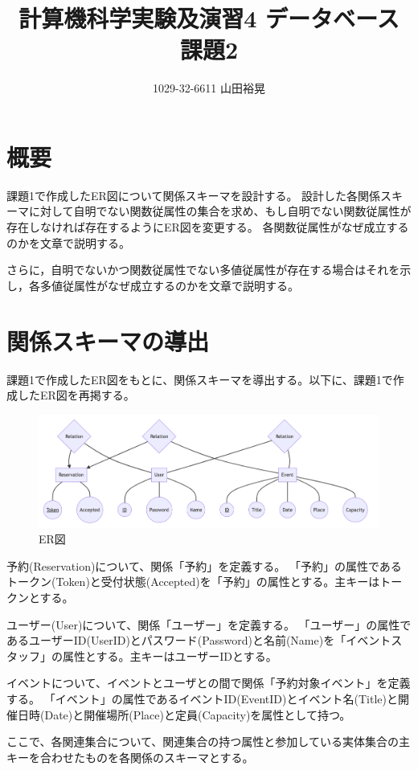 \documentclass[dvipdfmx]{jarticle}
\begin{document}
\title{計算機科学実験及演習4 データベース 課題2}
\author{1029-32-6611 山田裕晃}
\maketitle

\section{概要}
課題1で作成したER図について関係スキーマを設計する。
設計した各関係スキーマに対して自明でない関数従属性の集合を求め、もし自明でない関数従属性が存在しなければ存在するようにER図を変更する。
各関数従属性がなぜ成立するのかを文章で説明する。

さらに，自明でないかつ関数従属性でない多値従属性が存在する場合はそれを示し，各多値従属性がなぜ成立するのかを文章で説明する。

\section{関係スキーマの導出}
課題1で作成したER図をもとに、関係スキーマを導出する。以下に、課題1で作成したER図を再掲する。
\begin{figure}[H]
  \centering
  \includegraphics[scale=0.4]{ermodel.png}
  \caption{ER図}
\end{figure}

予約(Reservation)について、関係「予約」を定義する。
「予約」の属性であるトークン(Token)と受付状態(Accepted)を「予約」の属性とする。主キーはトークンとする。

ユーザー(User)について、関係「ユーザー」を定義する。
「ユーザー」の属性であるユーザーID(UserID)とパスワード(Password)と名前(Name)を「イベントスタッフ」の属性とする。主キーはユーザーIDとする。

イベントについて、イベントとユーザとの間で関係「予約対象イベント」を定義する。
「イベント」の属性であるイベントID(EventID)とイベント名(Title)と開催日時(Date)と開催場所(Place)と定員(Capacity)を属性として持つ。

ここで、各関連集合について、関連集合の持つ属性と参加している実体集合の主キーを合わせたものを各関係のスキーマとする。
\end{document}

